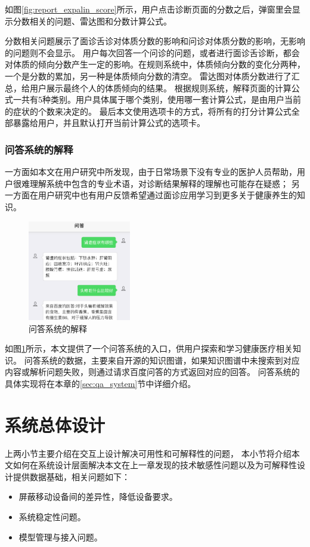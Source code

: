 如图\ref{fig:report_expalin_score}所示，用户点击诊断页面的分数之后，弹窗里会显示分数相关的问题、雷达图和分数计算公式。

分数相关问题展示了面诊舌诊对体质分数的影响和问诊对体质分数的影响，无影响的问题则不会显示。
用户每次回答一个问诊的问题，或者进行面诊舌诊断，都会对体质的倾向分数产生一定的影响。在规则系统中，体质倾向分数的变化分两种，一个是分数的累加，另一种是体质倾向分数的清空。
雷达图对体质分数进行了汇总，给用户展示最终个人的体质倾向的结果。
根据规则系统，解释页面的计算公式一共有5种类别。用户具体属于哪个类别，使用哪一套计算公式，是由用户当前的症状的个数来决定的。
最后本文使用选项卡的方式，将所有的打分计算公式全部暴露给用户，并且默认打开当前计算公式的选项卡。

\subsubsection{问答系统的解释}



一方面如本文在用户研究中所发现，由于日常场景下没有专业的医护人员帮助，用户很难理解系统中包含的专业术语，对诊断结果解释的理解也可能存在疑惑；
另一方面在用户研究中也有用户反馈希望通过面诊应用学习到更多关于健康养生的知识。

\begin{figure}[h]
    \centering
    \includegraphics[width=4.5cm]{images/ans2.png}
    \caption{问答系统的解释}
    \label{fig:explain_qa}
\end{figure}

如图\ref{fig:explain_qa}所示，本文提供了一个问答系统的入口，供用户探索和学习健康医疗相关知识。
问答系统的数据，主要来自开源的知识图谱，如果知识图谱中未搜索到对应内容或解析问题失败，则通过请求百度问答的方式返回对应的回答。
问答系统的具体实现将在本章的\ref{sec:qa_system}节中详细介绍。



\section{系统总体设计}
上两小节主要介绍在交互上设计解决可用性和可解释性的问题，
本小节将介绍本文如何在系统设计层面解决本文在上一章发现的技术敏感性问题以及为可解释性设计提供数据基础，相关问题如下：
\begin{itemize}
    \item 屏蔽移动设备间的差异性，降低设备要求。
    \item 系统稳定性问题。
    \item 模型管理与接入问题。
\end{itemize}

